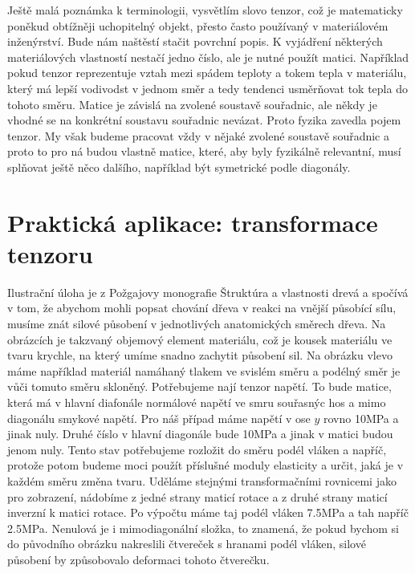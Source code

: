 \documentclass[12pt]{article}
\begin{document}
Ještě malá poznámka k terminologii, vysvětlím slovo tenzor, což je matematicky poněkud obtížněji uchopitelný objekt, přesto často používaný v materiálovém inženýrství. Bude nám naštěstí stačit povrchní popis. K vyjádření některých materiálových vlastností nestačí jedno číslo, ale je nutné použít matici. Například  pokud tenzor reprezentuje vztah mezi spádem teploty a tokem tepla v materiálu, který má lepší vodivodst v jednom směr a tedy tendenci usměrňovat tok tepla do tohoto směru. Matice je závislá na zvolené soustavě souřadnic, ale někdy je vhodné se na konkrétní soustavu souřadnic nevázat. Proto fyzika zavedla pojem tenzor. My však budeme pracovat vždy v nějaké zvolené soustavě souřadnic a proto to pro ná budou vlastně matice, které, aby byly fyzikálně relevantní, musí splňovat ještě něco dalšího, například být symetrické podle diagonály. 

\section{Praktická aplikace: transformace tenzoru}

Ilustrační úloha je z Požgajovy monografie Štruktúra a vlastnosti drevá a spočívá v tom, že abychom mohli popsat chování dřeva v reakci na vnější působící sílu, musíme znát silové působení v jednotlivých anatomických směrech dřeva. Na obrázcích je takzvaný objemový element materiálu, což je kousek materiálu ve tvaru krychle, na který umíme snadno zachytit působení sil. Na obrázku vlevo máme například materiál namáhaný tlakem ve svislém směru a podélný směr je vůči tomuto směru skloněný. Potřebujeme nají tenzor napětí. To bude matice, která má v hlavní diafonále normálové napětí ve smru souřasnýc hos a mimo diagonálu smykové napětí. Pro náš případ máme napětí v ose $y$ rovno 10MPa a jinak nuly. Druhé číslo v hlavní diagonále bude 10MPa a jinak v matici budou jenom nuly. Tento stav potřebujeme rozložit do směru podél vláken a napříč, protože potom budeme moci použít příslušné moduly elasticity a určit, jaká je v každém směru změna tvaru. Uděláme stejnými transformačními rovnicemi jako pro zobrazení, nádobíme z jedné strany maticí rotace a z druhé strany maticí inverzní k matici rotace. Po výpočtu máme taj podél vláken 7.5MPa a tah napříč 2.5MPa. Nenulová je i mimodiagonální složka, to znamená, že pokud bychom si do původního obrázku nakreslili čtvereček s hranami podél vláken, silové působení by způsobovalo deformaci tohoto čtverečku. 
\end{document}
